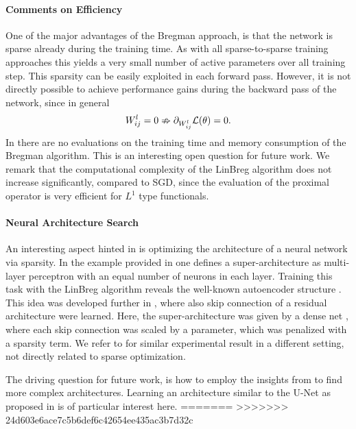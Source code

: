 \paragraph{Comments on Efficiency} One of the major advantages of the Bregman approach, is that the network is sparse already during the training time. As with all sparse-to-sparse training approaches this yields a very small number of active parameters over all training step. This sparsity can be easily exploited in each forward pass. However, it is not directly possible to achieve performance gains during the backward pass of the network, since in general
%
\begin{align*}
W^l_{ij} = 0 \nRightarrow \partial_{W^l_{ij}} \mathcal{L}(\theta) = 0.
\end{align*}
%
In \cite{bungert2022bregman, bungert2021neural} there are no evaluations on the training time and memory consumption of the Bregman algorithm. This is an interesting open question for future work. We remark that the computational complexity of the LinBreg algorithm does not increase significantly, compared to SGD, since the evaluation of the proximal operator is very efficient for $L^1$ type functionals.

\paragraph{Neural Architecture Search} An interesting aspect hinted in \cite{bungert2022bregman} is optimizing the architecture of a neural network via sparsity. In the example provided in \cite[Fig. 4]{bungert2022bregman} one defines a super-architecture as multi-layer perceptron with an equal number of neurons in each layer. Training this task with the LinBreg algorithm reveals the well-known autoencoder structure \cite{hinton1993autoencoders}. This idea was developed further in \cite{bungert2021neural}, where also skip connection of a residual architecture were learned. Here, the super-architecture was given by a dense net \cite{huang2017densely}, where each skip connection was scaled by a parameter, which was penalized with a sparsity term. We refer to \cite{cipriani2023neurodes} for similar experimental result in a different setting, not directly related to sparse optimization.

The driving question for future work, is how to employ the insights from \cite{bungert2021neural} to find more complex architectures. Learning an architecture similar to the U-Net as proposed in \cite{ronneberger2015u} is of particular interest here.
%
%
%
%
\clearpage%
=======
>>>>>>> 24d603e6ace7c5b6def6c42654ee435ac3b7d32c
%
